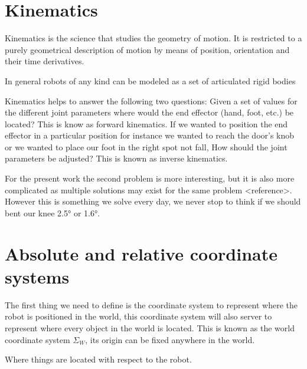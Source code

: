 \documentclass[a4paper]{report}
\begin{document}
\section{Kinematics}
Kinematics is the science that studies the geometry of motion. It is restricted to a purely geometrical description of motion by means of position, orientation and their time derivatives. 

In general robots of any kind can be modeled as a set of articulated rigid bodies

Kinematics helps to answer the following two questions:
Given a set of values for the different joint parameters where would the end effector (hand, foot, etc.) be located? This is know as forward kinematics.
If we wanted to position the end effector in a particular position for instance we wanted to reach the door's knob or we wanted to place our foot in the right spot not fall, How should the joint parameters be adjusted? This is known as inverse kinematics.

For the present work the second problem is more interesting, but it is also more complicated as multiple solutions may exist for the same problem <reference>. However this is something we solve every day, we never stop to think if we should bent our knee 2.5° or 1.6°.

\section{Absolute and relative coordinate systems}
The first thing we need to define is the coordinate system to represent where the robot is positioned in the world, this coordinate system will also server to represent where every object in the world is located. This is known as the world coordinate system $\Sigma_W$, its origin can be fixed anywhere in the world.

Where things are located with respect to the robot. 

\section{}
\end{document}
